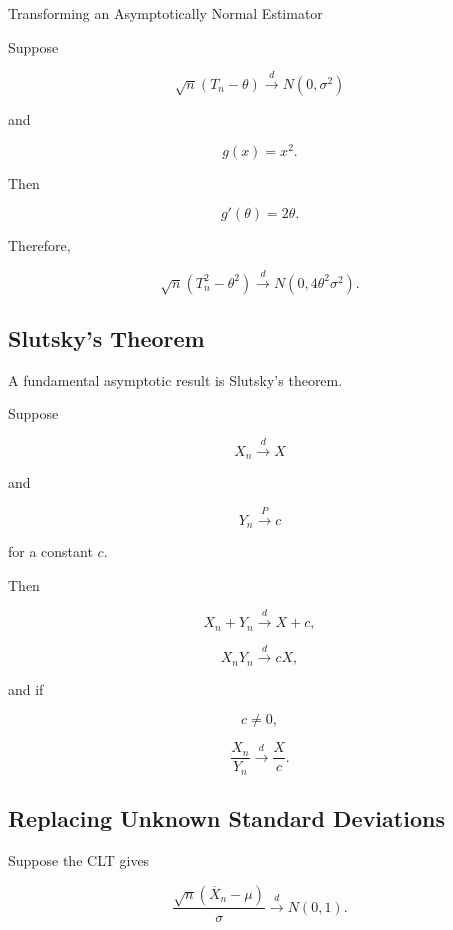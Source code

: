\begin{workedexamplebox}{Transforming an Asymptotically Normal Estimator}

Suppose

\[
\sqrt{n}
(T_n-\theta)
\xrightarrow{d}
N(0,\sigma^2)
\]

and

\[
g(x)=x^2.
\]

Then

\[
g'(\theta)=2\theta.
\]

Therefore,

\begin{answerbox}
\[
\boxed{
\sqrt{n}
(T_n^2-\theta^2)
\xrightarrow{d}
N
\left(
0,
4\theta^2\sigma^2
\right).
}
\]
\end{answerbox}

\end{workedexamplebox}

\subsection{Slutsky's Theorem}
\label{subsec:slutsky-clt}

A fundamental asymptotic result is Slutsky's theorem.

Suppose

\[
X_n
\xrightarrow{d}
X
\]

and

\[
Y_n
\xrightarrow{P}
c
\]

for a constant \(c\).

Then

\[
\boxed{
X_n+Y_n
\xrightarrow{d}
X+c,
}
\]

\[
\boxed{
X_nY_n
\xrightarrow{d}
cX,
}
\]

and if

\[
c\neq0,
\]

\[
\boxed{
\frac{X_n}{Y_n}
\xrightarrow{d}
\frac{X}{c}.
}
\]

\subsection{Replacing Unknown Standard Deviations}
\label{subsec:replace-sigma-slutsky}

Suppose the CLT gives

\[
\frac{
\sqrt{n}
(\overline{X}_n-\mu)
}{
\sigma
}
\xrightarrow{d}
N(0,1).
\]

